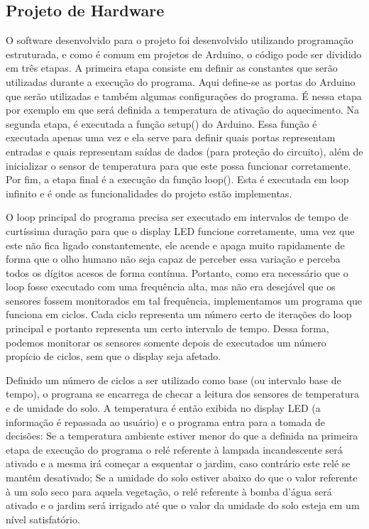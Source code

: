 \documentclass[a4paper,12pt]{article}
\begin{document}
\subsection{Projeto de Hardware}
O software desenvolvido para o projeto foi desenvolvido utilizando programação estruturada, e como é comum em projetos de Arduino, o código pode ser dividido em três etapas. A primeira etapa consiste em definir as constantes que serão utilizadas durante a execução do programa. Aqui define-se as portas do Arduino que serão utilizadas e também algumas configurações do programa. É nessa etapa por exemplo em que será definida a temperatura de ativação do aquecimento. Na segunda etapa, é executada a função setup() do Arduino. Essa função é executada apenas uma vez e ela serve para definir quais portas representam entradas e quais representam saídas de dados (para proteção do circuito), além de inicializar o sensor de temperatura para que este possa funcionar corretamente. Por fim, a etapa final é a execução da função loop(). Esta é executada em loop infinito e é onde as funcionalidades do projeto estão implementas.

    O loop principal do programa precisa ser executado em intervalos de tempo de curtíssima duração para que o display LED funcione corretamente, uma vez que este não fica ligado constantemente, ele acende e apaga muito rapidamente de forma que o olho humano não seja capaz de perceber essa variação e perceba todos os dígitos acesos de forma contínua. Portanto, como era necessário que o loop fosse executado com uma frequência alta, mas não era desejável que os sensores fossem monitorados em tal frequência, implementamos um programa que funciona em ciclos. Cada ciclo representa um número certo de iterações do loop principal e portanto representa um certo intervalo de tempo. Dessa forma, podemos monitorar os sensores somente depois de executados um número propício de ciclos, sem que o display seja afetado.
    
    Definido um número de ciclos a ser utilizado como base (ou intervalo base de tempo), o programa se encarrega de checar a leitura dos sensores de temperatura e de umidade do solo. A temperatura é então exibida no display LED (a informação é repassada ao usuário) e o programa entra para a tomada de decisões: Se a temperatura ambiente estiver menor do que a definida na primeira etapa de execução do programa o relé referente à lampada incandescente será ativado e a mesma irá começar a esquentar o jardim, caso contrário este relé se mantêm desativado; Se a umidade do solo estiver abaixo do que o valor referente à um solo seco para aquela vegetação, o relé referente à bomba d’água será ativado e o jardim será irrigado até que o valor da umidade do solo esteja em um nível satisfatório.
\end{document}
